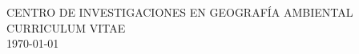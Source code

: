 \documentclass[12pt]{report}
\begin{document}
\begin{center}
 CENTRO DE INVESTIGACIONES EN GEOGRAFÍA AMBIENTAL \\
 CURRICULUM VITAE \\
\today \\
\end{center}

\renewcommand{\labelenumi}{%
 \textbf{\theenumi}. }

\renewcommand{\theenumii}{\arabic{enumii}}
\renewcommand{\labelenumii}{%
    \textbf{\theenumi}.\theenumii. }

\renewcommand{\theenumiii}{\arabic{enumiii}}
\renewcommand{\labelenumiii}{%
    \textbf{\theenumi}.\theenumii.\theenumiii.}

\renewcommand{\labelitemi}{\tiny$\blacksquare$}
\renewcommand{\labelitemii}{\tiny$\blacksquare$}
\renewcommand{\labelitemiii}{\tiny$\blacksquare$}
\end{document}
